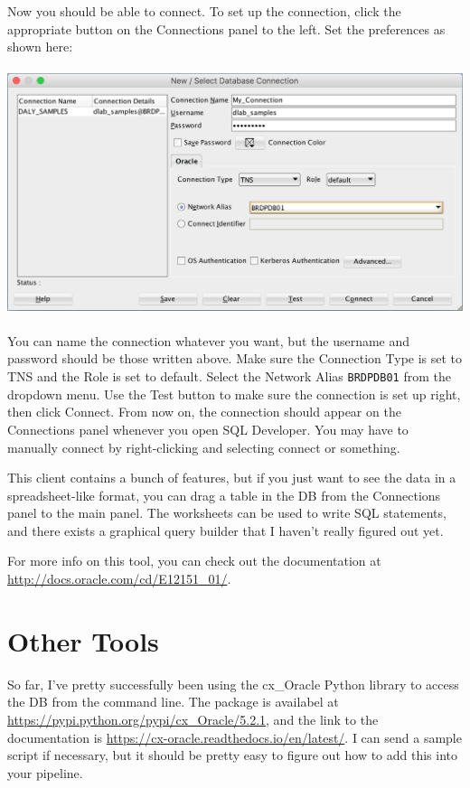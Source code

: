 \documentclass[11pt]{article} %
\begin{document}
Now you should be able to connect. To set up the connection, click the appropriate button on the Connections panel to the left. Set the preferences as shown here:
\\
\\
\includegraphics[scale=0.5]{Connection.png}
\\
\\
You can name the connection whatever you want, but the username and password should be those written above. Make sure the Connection Type is set to TNS and the Role is set to default. Select the Network Alias \texttt{BRDPDB01} from the dropdown menu. Use the Test button to make sure the connection is set up right, then click Connect. From now on, the connection should appear on the Connections panel whenever you open SQL Developer. You may have to manually connect by right-clicking and selecting connect or something.

This client contains a bunch of features, but if you just want to see the data in a spreadsheet-like format, you can drag a table in the DB from the Connections panel to the main panel. The worksheets can be used to write SQL statements, and there exists a graphical query builder that I haven't really figured out yet.

For more info on this tool, you can check out the documentation at \url{http://docs.oracle.com/cd/E12151_01/}.

\section{Other Tools}
So far, I've pretty successfully been using the cx\_Oracle Python library to access the DB from the command line. The package is availabel at \url{https://pypi.python.org/pypi/cx_Oracle/5.2.1}, and the link to the documentation is \url{https://cx-oracle.readthedocs.io/en/latest/}. I can send a sample script if necessary, but it should be pretty easy to figure out how to add this into your pipeline.
\end{document}

